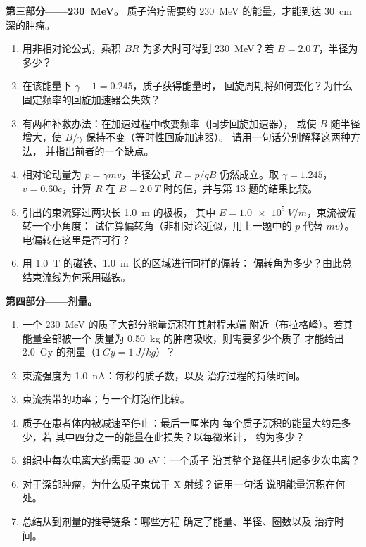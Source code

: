 \begin{problem}
\medskip
\noindent\textbf{第三部分——\qty{230}{MeV}。}
质子治疗需要约 \qty{230}{MeV} 的能量，才能到达
\qty{30}{cm} 深的肿瘤。
\begin{enumerate}[resume]
  \item 用非相对论公式，乘积 $BR$ 为多大时可得到
        \qty{230}{MeV}？若 $B = \qty{2.0}{T}$，半径为多少？
  \item 在该能量下 $\gamma - 1 = 0.245$，质子获得能量时，
        回旋周期将如何变化？为什么
        固定频率的回旋加速器会失效？
  \item 有两种补救办法：在加速过程中改变频率（同步回旋加速器），
        或使 $B$ 随半径增大，使 $B/\gamma$ 保持不变（等时性回旋加速器）。
        请用一句话分别解释这两种方法，
        并指出前者的一个缺点。
  \item 相对论动量为 $p = \gamma mv$，半径公式 $R =
        p/qB$ 仍然成立。取 $\gamma = 1.245$，$v = 0.60c$，计算
        $R$ 在 $B = \qty{2.0}{T}$ 时的值，并与第 13 题的结果比较。
  \item 引出的束流穿过两块长 \qty{1.0}{m} 的极板，
        其中 $E = \qty{1.0e5}{V/m}$，束流被偏转一个小角度：
        试估算偏转角（非相对论近似，用上一题中的 $p$
        代替 $mv$）。
        电偏转在这里是否可行？
  \item 用 \qty{1.0}{T} 的磁铁、\qty{1.0}{m} 长的区域进行同样的偏转：
        偏转角为多少？由此总结束流线为何采用磁铁。
\end{enumerate}

\medskip
\noindent\textbf{第四部分——剂量。}
\begin{enumerate}[resume]
  \item 一个 \qty{230}{MeV} 的质子大部分能量沉积在其射程末端
        附近（布拉格峰）。若其能量全部被一个
        质量为 \qty{0.50}{kg} 的肿瘤吸收，则需要多少个质子
        才能给出 \qty{2.0}{Gy} 的剂量（$\qty{1}{Gy} = \qty{1}{J/kg}$）？
  \item 束流强度为 \qty{1.0}{nA}：每秒的质子数，以及
        治疗过程的持续时间。
  \item 束流携带的功率；与一个灯泡作比较。
  \item 质子在患者体内被减速至停止：最后一厘米内
        每个质子沉积的能量大约是多少，若
        其中四分之一的能量在此损失？以每微米计，
        约为多少？
  \item 组织中每次电离大约需要 \qty{30}{eV}：一个质子
        沿其整个路径共引起多少次电离？
  \item 对于深部肿瘤，为什么质子束优于 X 射线？请用一句话
        说明能量沉积在何处。
  \item 总结从到剂量的推导链条：哪些方程
        确定了能量、半径、圈数以及
        治疗时间。
\end{enumerate}
\end{problem}
